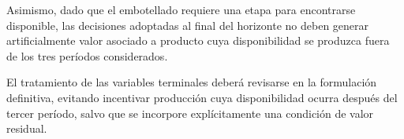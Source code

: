 Asimismo, dado que el embotellado requiere una etapa para encontrarse
disponible, las decisiones adoptadas al final del horizonte no deben generar
artificialmente valor asociado a producto cuya disponibilidad se produzca
fuera de los tres períodos considerados.

El tratamiento de las variables terminales deberá revisarse en la formulación
definitiva, evitando incentivar producción cuya disponibilidad ocurra después
del tercer período, salvo que se incorpore explícitamente una condición de
valor residual.